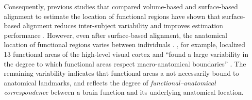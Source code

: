 Consequently, previous studies that compared volume-based and surface-based
alignment to estimate the location of functional regions have shown that
surface-based alignment reduces inter-subject variability and improves
estimation performance \citep{rosenke2021probabilistic, frost2012measuring,
wang2015probabilistic, weiner2018defining}.
However, even after surface-based alignment, the anatomical location of
functional regions varies between individuals \citep[e.g.,][]{coalson2018impact,
benson2014correction, natu2021sulcal, wang2015probabilistic, frost2012measuring,
langers2014assessment, weiner2014mid, rosenke2021probabilistic}.
\citet{frost2012measuring}, for example, localized 13 functional areas of the
high-level visual cortex and ``found a large variability in the degree to which
functional areas respect macro-anatomical boundaries'' \citep[][p.
1369]{frost2012measuring}.
The remaining variability indicates that functional areas a not necessarily
bound to anatomical landmarks, and reflects the degree of
\textit{functional--anatomical correspondence} between a brain function and its
underlying anatomical location.


